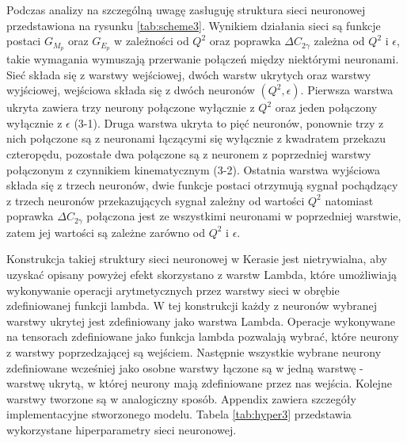 \documentclass[11pt]{book}
\theoremstyle{definition}
\begin{document}
Podczas analizy na szczególną uwagę zasługuję struktura sieci neuronowej przedstawiona na rysunku \ref{tab:scheme3}. Wynikiem działania sieci są funkcje postaci $G_{M_p}$ oraz $G_{E_p}$ w zależności od $Q^2$ oraz poprawka $\Delta C_{2\gamma}$ zależna od $Q^2$ i $\epsilon$, takie wymagania wymuszają przerwanie połączeń między niektórymi neuronami. Sieć składa się z warstwy wejściowej, dwóch warstw ukrytych oraz warstwy wyjściowej, wejściowa składa się z dwóch neuronów $(Q^2, \epsilon)$. Pierwsza warstwa ukryta zawiera trzy neurony połączone wyłącznie z $Q^2$ oraz jeden połączony wyłącznie z $\epsilon$ (3-1). Druga warstwa ukryta to pięć neuronów, ponownie trzy z nich połączone są z neuronami łączącymi się wyłącznie z kwadratem przekazu czteropędu, pozostałe dwa połączone są z neuronem z poprzedniej warstwy połączonym z czynnikiem kinematycznym (3-2). Ostatnia warstwa wyjściowa składa się z trzech neuronów, dwie funkcje postaci otrzymują sygnał pochądzący z trzech neuronów przekazujących sygnał zależny od wartości $Q^2$ natomiast poprawka $\Delta C_{2\gamma}$ połączona jest ze wszystkimi neuronami w poprzedniej warstwie, zatem jej wartości są zależne zarówno od $Q^2$ i $\epsilon$. 

Konstrukcja takiej struktury sieci neuronowej w Kerasie jest nietrywialna, aby uzyskać opisany powyżej efekt skorzystano z warstw Lambda, które umożliwiają wykonywanie operacji arytmetycznych przez warstwy sieci w obrębie zdefiniowanej funkcji lambda. W tej konstrukcji każdy z neuronów wybranej warstwy ukrytej jest zdefiniowany jako warstwa Lambda. Operacje wykonywane na tensorach zdefiniowane jako funkcja lambda pozwalają wybrać, które neurony z warstwy poprzedzającej są wejściem. Następnie wszystkie wybrane neurony zdefiniowane wcześniej jako osobne warstwy łączone są w jedną warstwę - warstwę ukrytą, w której neurony mają zdefiniowane przez nas wejścia. Kolejne warstwy tworzone są w analogiczny sposób. Appendix zawiera szczegóły implementacyjne stworzonego modelu. Tabela \ref{tab:hyper3} przedstawia wykorzystane hiperparametry sieci neuronowej. 
\end{document}
